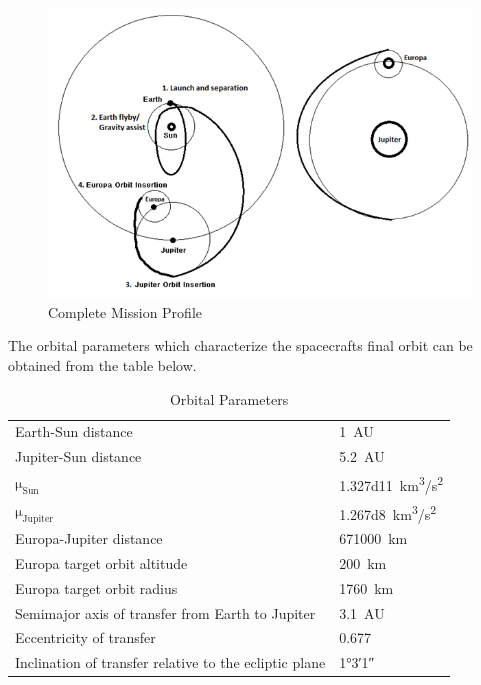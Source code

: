 \begin{figure}[H]
  \includegraphics[width=\textwidth]{Mission-Profile}
  \caption{Complete Mission Profile}
\end{figure}



The orbital parameters which characterize the spacecrafts final orbit
can be obtained from the table below.

\begin{longtable}{ll}
  \caption{Orbital Parameters \cite{JupiterFactSheet}} \\

  Earth-Sun distance & \SI{1}{AU} \\

  Jupiter-Sun distance & \SI{5.2}{AU} \\

  $\mathrm{\mu_{Sun}}$ & \SI{1.327d11}{km^3/s^2} \\

  $\mathrm{\mu_{Jupiter}}$ & \SI{1.267d8}{km^3/s^2} \\

  Europa-Jupiter distance & \SI{671000}{km} \\

  Europa target orbit altitude & \SI{200}{km} \\

  Europa target orbit radius & \SI{1760}{km} \\

  Semimajor axis of transfer from Earth to Jupiter

  & \SI{3.1}{AU} \\

  Eccentricity of transfer & 0.677 \\

  Inclination of transfer relative to the ecliptic plane & \ang{1;3;1}
  \\
\end{longtable}


